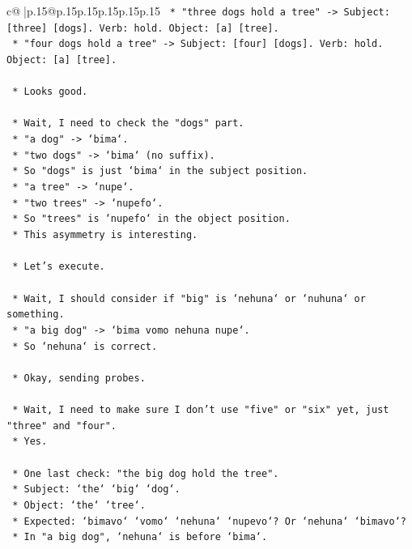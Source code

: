 \documentclass{article}
\begin{document}
{\begin{supertabular}{c@{$\;$}|p{.15\linewidth}@{}p{.15\linewidth}p{.15\linewidth}p{.15\linewidth}p{.15\linewidth}p{.15\linewidth}}
{{{\texttt{    *   "three dogs hold a tree" {-}> Subject: {[}three{]} {[}dogs{]}. Verb: hold. Object: {[}a{]} {[}tree{]}.} \\
\texttt{    *   "four dogs hold a tree" {-}> Subject: {[}four{]} {[}dogs{]}. Verb: hold. Object: {[}a{]} {[}tree{]}.} \\
\\ 
\texttt{    *   Looks good.} \\
\\ 
\texttt{    *   Wait, I need to check the "dogs" part.} \\
\texttt{    *   "a dog" {-}> `bima`.} \\
\texttt{    *   "two dogs" {-}> `bima` (no suffix).} \\
\texttt{    *   So "dogs" is just `bima` in the subject position.} \\
\texttt{    *   "a tree" {-}> `nupe`.} \\
\texttt{    *   "two trees" {-}> `nupefo`.} \\
\texttt{    *   So "trees" is `nupefo` in the object position.} \\
\texttt{    *   This asymmetry is interesting.} \\
\\ 
\texttt{    *   Let's execute.} \\
\\ 
\texttt{    *   Wait, I should consider if "big" is `nehuna` or `nuhuna` or something.} \\
\texttt{    *   "a big dog" {-}> `bima vomo nehuna nupe`.} \\
\texttt{    *   So `nehuna` is correct.} \\
\\ 
\texttt{    *   Okay, sending probes.} \\
\\ 
\texttt{    *   Wait, I need to make sure I don't use "five" or "six" yet, just "three" and "four".} \\
\texttt{    *   Yes.} \\
\\ 
\texttt{    *   One last check: "the big dog hold the tree".} \\
\texttt{    *   Subject: `the` `big` `dog`.} \\
\texttt{    *   Object: `the` `tree`.} \\
\texttt{    *   Expected: `bimavo` `vomo` `nehuna` `nupevo`? Or `nehuna` `bimavo`?} \\
\texttt{    *   In "a big dog", `nehuna` is before `bima`.} \\
}}}
\end{supertabular}}
\end{document}
